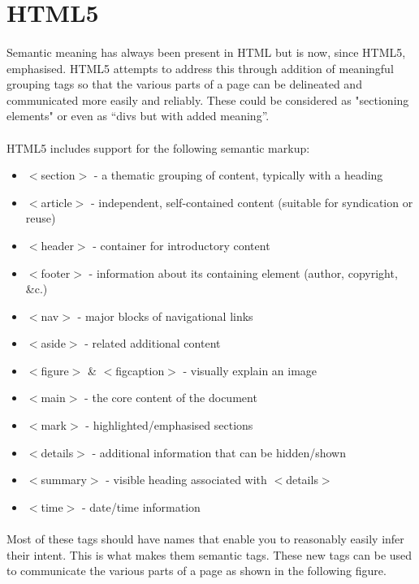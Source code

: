 \section{HTML5}

\paragraph{} Semantic meaning has always been present in HTML but is now, since HTML5, emphasised. HTML5 attempts to address this through addition of meaningful grouping tags so that the various parts of a page can be delineated and communicated more easily and reliably. These could be considered as "sectioning elements" or even as “divs but with added meaning”. 

\paragraph{} HTML5 includes support for the following semantic markup:
\begin{itemize}
\item $<$section$>$ - a thematic grouping of content, typically with a heading
\item $<$article$>$ - independent, self-contained content (suitable for syndication or reuse)
\item $<$header$>$ - container for introductory content
\item $<$footer$>$ - information about its containing element (author, copyright, \&c.)
\item $<$nav$>$ - major blocks of navigational links
\item $<$aside$>$ - related additional content
\item $<$figure$>$ \& $<$figcaption$>$ - visually explain an image
\item $<$main$>$ - the core content of the document
\item $<$mark$>$ - highlighted/emphasised sections
\item $<$details$>$ - additional information that can be hidden/shown
\item $<$summary$>$ - visible heading associated with $<$details$>$
\item $<$time$>$ - date/time information
\end{itemize}

\paragraph{} Most of these tags should have names that enable you to reasonably easily infer their intent. This is what makes them semantic tags. These new tags can be used to communicate the various parts of a page as shown in the following figure.


